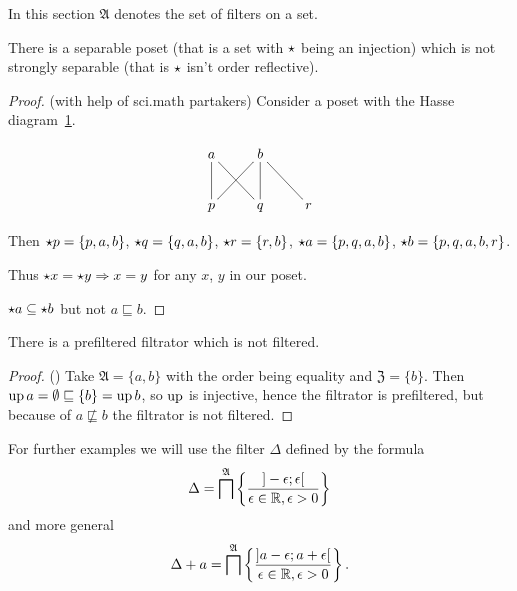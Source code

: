 In this section $\mathfrak{A}$ denotes the set of filters on a set.
\begin{example}
There is a separable poset (that is a set with $\star$ being
an injection) which is not strongly separable (that is $\star$ isn't order reflective).\end{example}
\begin{proof}
(with help of sci.math partakers) Consider a poset with the Hasse
diagram~\ref{sep-counter}.

\begin{figure}[ht]
\caption{\label{sep-counter}}
\[
\xymatrix{a\ar@{-}[d]\ar@{-}[dr] & b\ar@{-}[dl]\ar@{-}[d]\ar@{-}[dr]\\
p & q & r
}
\]
\end{figure}


Then $\star p=\{p,a,b\}$, $\star q=\{q,a,b\}$, $\star r=\{r,b\}$,
$\star a=\{p,q,a,b\}$, $\star b=\{p,q,a,b,r\}$.

Thus $\star x=\star y\Rightarrow x=y$ for any $x$, $y$
in our poset.

$\star a\subseteq\star b$ but not $a\sqsubseteq b$.\end{proof}
\begin{example}
There is a prefiltered filtrator which is not filtered.\end{example}
\begin{proof}
() Take $\mathfrak{A}=\{a,b\}$ with the order
being equality and $\mathfrak{Z}=\{b\}$. Then $\operatorname{up} a=\emptyset\sqsubseteq\{b\}=\operatorname{up} b$,
so $\operatorname{up}$ is injective, hence the filtrator is prefiltered, but because
of $a\nsqsubseteq b$ the filtrator is not filtered.
\end{proof}
For further examples we will use the filter $\Delta$ defined by the
formula
\[
\Delta=\bigsqcap^{\mathfrak{A}}\left\{ \frac{]-\epsilon;\epsilon[}{\epsilon\in\mathbb{R},\epsilon>0}\right\}
\]
and more general
\[
\Delta+a=\bigsqcap^{\mathfrak{A}}\left\{ \frac{]a-\epsilon;a+\epsilon[}{\epsilon\in\mathbb{R},\epsilon>0}\right\}.
\]

